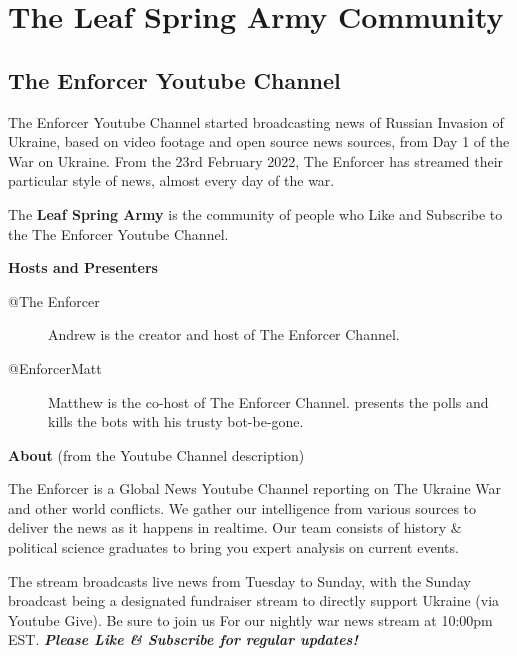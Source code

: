 \documentclass[11pt]{book}
\begin{document}
\clearpage

\flags





\part{The Leaf Spring Army Community}

\chapter{The Enforcer Youtube Channel}

The Enforcer Youtube Channel started broadcasting news of Russian Invasion of Ukraine, based on 
video footage and open source news sources, from Day 1 of the War on Ukraine.
From the 23rd February 2022, The Enforcer has streamed their particular style of news, 
almost every day of the war.

The \textbf{Leaf Spring Army} is the community of people who Like and Subscribe to the 
The Enforcer Youtube Channel. 

\textbf{Hosts and Presenters}

\begin{description}
\item[@The Enforcer] Andrew is the creator and host of The Enforcer Channel. 
\item[@EnforcerMatt] Matthew is the co-host of The Enforcer Channel. 
presents the polls and kills the bots with his trusty bot-be-gone.
\end{description}

\textbf{About} (from the Youtube Channel description)

The Enforcer is a Global News Youtube Channel reporting on The Ukraine War
and other world conflicts.
We gather our intelligence from various sources to deliver the news as it happens
in realtime. Our team consists of history \& political science graduates to bring you
expert analysis on current events.

The stream broadcasts live news from Tuesday to Sunday, with the Sunday
broadcast being a designated fundraiser stream to directly support Ukraine
(via Youtube Give). Be sure to join us For our nightly war news stream at 10:00pm EST. 
\textbf{\textit{Please Like \& Subscribe for regular updates!}}
\end{document}
